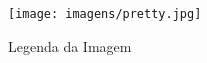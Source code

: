 \clearpage

\begin{figure}[!htb]
	\centering
	\texttt{[image: imagens/pretty.jpg]}
	\caption{Legenda da Imagem}
	\label{Label de referência para a imagem}
\end{figure}
